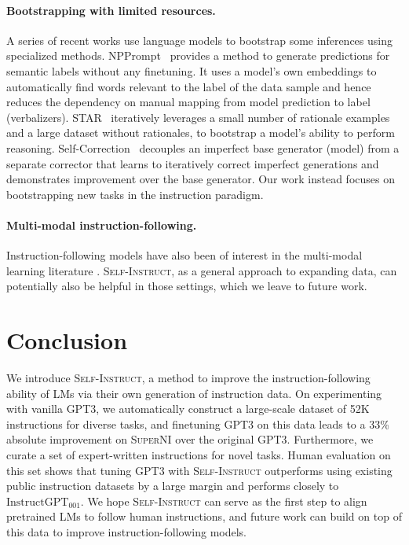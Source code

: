 \paragraph{Bootstrapping with limited resources.} A series of recent works use language models to bootstrap some inferences using specialized methods. NPPrompt~\cite{zhao2022pre} provides a method to generate predictions for semantic labels without any finetuning. It uses a model's own embeddings to automatically find words relevant to the label of the data sample and hence reduces the dependency on manual mapping from model prediction to label (verbalizers). STAR~\cite{zelikman2022star} iteratively leverages a small number of rationale examples and a large dataset without rationales, to bootstrap a model's ability to perform reasoning.  Self-Correction~\cite{welleck2022generating} decouples an imperfect base generator (model) from a separate corrector that learns to iteratively correct imperfect generations and demonstrates improvement over the base generator. Our work instead focuses on bootstrapping new tasks in the instruction paradigm.

\paragraph{Multi-modal instruction-following.} Instruction-following models have also been of interest in the multi-modal learning literature \cite{fried2018speaker, shridhar2020alfred, min2022film, weir2022one}.
\textsc{Self-Instruct}, as a general approach to expanding data, can potentially also be helpful in those settings, which we leave to future work.

\section{Conclusion}
\label{sec:conclusion}
We introduce \textsc{Self-Instruct}, a method to improve the instruction-following ability of LMs via their own generation of instruction data. On experimenting with vanilla \textsc{GPT3}, we automatically construct a large-scale dataset of 52K instructions for diverse tasks, and finetuning GPT3 on this data leads to a 33\% absolute improvement on \textsc{SuperNI} over the original \textsc{GPT3}. Furthermore, we curate a set of expert-written instructions for novel tasks. Human evaluation on this set shows that tuning GPT3 with \textsc{Self-Instruct} outperforms using existing public instruction datasets by a large margin and performs closely to $\text{InstructGPT}_{\text{001}}$.
We hope \textsc{Self-Instruct} can serve as the first step to align pretrained LMs to follow human instructions, and future work can build on top of this data to improve instruction-following models.

